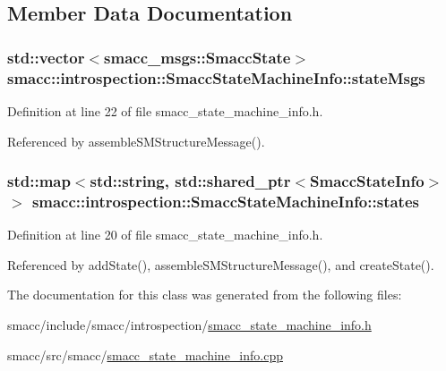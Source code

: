 \subsection{Member Data Documentation}
\subsubsection[{\texorpdfstring{state\+Msgs}{stateMsgs}}]{\setlength{\rightskip}{0pt plus 5cm}std\+::vector$<$smacc\+\_\+msgs\+::\+Smacc\+State$>$ smacc\+::introspection\+::\+Smacc\+State\+Machine\+Info\+::state\+Msgs}\hypertarget{classsmacc_1_1introspection_1_1SmaccStateMachineInfo_a48e3ff7bbe2673d23e6942234446ebee}{}\label{classsmacc_1_1introspection_1_1SmaccStateMachineInfo_a48e3ff7bbe2673d23e6942234446ebee}


Definition at line 22 of file smacc\+\_\+state\+\_\+machine\+\_\+info.\+h.



Referenced by assemble\+S\+M\+Structure\+Message().

\subsubsection[{\texorpdfstring{states}{states}}]{\setlength{\rightskip}{0pt plus 5cm}std\+::map$<$std\+::string, std\+::shared\+\_\+ptr$<${\bf Smacc\+State\+Info}$>$ $>$ smacc\+::introspection\+::\+Smacc\+State\+Machine\+Info\+::states}\hypertarget{classsmacc_1_1introspection_1_1SmaccStateMachineInfo_aef31d74ad3669f0b0f57fe0e008cd2f8}{}\label{classsmacc_1_1introspection_1_1SmaccStateMachineInfo_aef31d74ad3669f0b0f57fe0e008cd2f8}


Definition at line 20 of file smacc\+\_\+state\+\_\+machine\+\_\+info.\+h.



Referenced by add\+State(), assemble\+S\+M\+Structure\+Message(), and create\+State().



The documentation for this class was generated from the following files\+:\begin{DoxyCompactItemize}
\item 
smacc/include/smacc/introspection/\hyperlink{smacc__state__machine__info_8h}{smacc\+\_\+state\+\_\+machine\+\_\+info.\+h}\item 
smacc/src/smacc/\hyperlink{smacc__state__machine__info_8cpp}{smacc\+\_\+state\+\_\+machine\+\_\+info.\+cpp}\end{DoxyCompactItemize}

